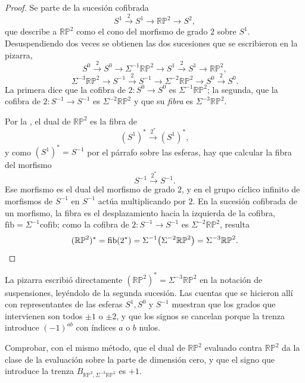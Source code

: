 \begin{proof}
Se parte de la sucesión cofibrada
\[
S^1\xrightarrow{\ 2\ }S^1\xrightarrow{\ }\mathbb{RP}^2\xrightarrow{\ }S^2 ,
\]
que describe a $\mathbb{RP}^2$ como el cono del morfismo de grado $2$ sobre $S^1$. Desuspendiendo dos veces se obtienen las dos sucesiones que se escribieron en la pizarra,
\[
S^0\xrightarrow{\ 2\ }S^0\longrightarrow\Sigma^{-1}\mathbb{RP}^2\longrightarrow S^1\xrightarrow{\ 2\ }S^1\longrightarrow\mathbb{RP}^2 ,
\]
\[
\Sigma^{-3}\mathbb{RP}^2\longrightarrow S^{-1}\xrightarrow{\ 2\ }S^{-1}\longrightarrow\Sigma^{-2}\mathbb{RP}^2\longrightarrow S^0\xrightarrow{\ 2\ }S^0 .
\]
La primera dice que la cofibra de $2\colon S^0\to S^0$ es $\Sigma^{-1}\mathbb{RP}^2$; la segunda, que la cofibra de $2\colon S^{-1}\to S^{-1}$ es $\Sigma^{-2}\mathbb{RP}^2$ y que su \emph{fibra} es $\Sigma^{-3}\mathbb{RP}^2$.

Por la , el dual de $\mathbb{RP}^2$ es la fibra de
\[
(S^1)^*\xrightarrow{\ 2^*\ }(S^1)^*,
\]
y como $(S^1)^*=S^{-1}$ por el párrafo sobre las esferas, hay que calcular la fibra del morfismo
\[
S^{-1}\xrightarrow{\ 2^*\ }S^{-1}.
\]
Ese morfismo es el dual del morfismo de grado $2$, y en el grupo cíclico infinito de morfismos de $S^{-1}$ en $S^{-1}$ actúa multiplicando por $2$. En la sucesión cofibrada de un morfismo, la fibra es el desplazamiento hacia la izquierda de la cofibra, $\mathrm{fib}=\Sigma^{-1}\mathrm{cofib}$; como la cofibra de $2\colon S^{-1}\to S^{-1}$ es $\Sigma^{-2}\mathbb{RP}^2$, resulta
\[
(\mathbb{RP}^2)^*=\mathrm{fib}(2^*)=\Sigma^{-1}\bigl(\Sigma^{-2}\mathbb{RP}^2\bigr)=\Sigma^{-3}\mathbb{RP}^2 . \qedhere
\]
\end{proof}

\begin{nota}
   La pizarra escribió directamente $(\mathbb{RP}^2)^*=\Sigma^{-3}\mathbb{RP}^2$ en la notación de suspensiones, leyéndolo de la segunda sucesión. Las cuentas que se hicieron allí con representantes de las esferas $S^1,S^0$ y $S^{-1}$ muestran que los grados que intervienen son todos $\pm1$ o $\pm2$, y que los signos se cancelan porque la trenza introduce $(-1)^{ab}$ con índices $a$ o $b$ nulos.
\end{nota}

\begin{ejer}
Comprobar, con el mismo método, que el dual de $\mathbb{RP}^2$ evaluado contra $\mathbb{RP}^2$ da la clase de la evaluación sobre la parte de dimensión cero, y que el signo que introduce la trenza $B_{\mathbb{RP}^2,\Sigma^{-3}\mathbb{RP}^2}$ es $+1$.
\end{ejer}

